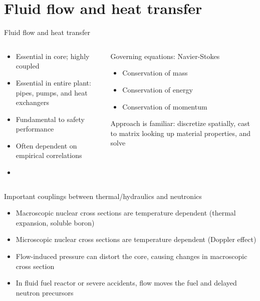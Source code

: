 \documentclass[pdf,aspectratio=169]{beamer}
\begin{document}
\section{Fluid flow and heat transfer}
\begin{frame}{Fluid flow and heat transfer}
\begin{columns}
    \begin{column}{0.5\textwidth}
        \begin{itemize}
            \item Essential in core; highly coupled 
            \item Essential in entire plant: pipes, pumps, and heat exchangers
            \item Fundamental to safety performance
            \item Often dependent on empirical correlations
            \item 
        \end{itemize}
    \end{column}
    \begin{column}{0.5\textwidth}
        Governing equations: Navier-Stokes
        \begin{itemize}
            \item Conservation of mass 
            \item Conservation of energy
            \item Conservation of momentum
        \end{itemize}
        Approach is familiar: discretize spatially, cast to matrix looking up material
        properties, and solve

    \end{column}
    \end{columns}
\end{frame}


\begin{frame}{Important couplings between thermal/hydraulics and neutronics}
        \begin{itemize}
            \item Macroscopic nuclear cross sections are temperature dependent (thermal
                expansion, soluble boron)
            \item Microscopic nuclear cross sections are temperature dependent (Doppler effect)
            \item Flow-induced pressure can distort the core, causing changes in
                macroscopic cross section
            \item In fluid fuel reactor or severe accidents, flow moves the fuel and
                delayed neutron precursors
        \end{itemize}
\end{frame}
\end{document}
